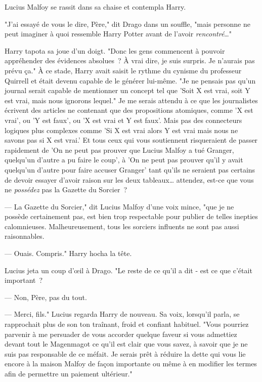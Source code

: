 Lucius Malfoy se rassit dans sa chaise et contempla Harry.

"J'ai essayé de vous le dire, Père," dit Drago dans un souffle, "mais personne ne peut imaginer à quoi ressemble Harry Potter avant de l'avoir \emph{rencontré}…"

Harry tapota sa joue d'un doigt. "Donc les gens commencent à pouvoir appréhender des évidences absolues~? À vrai dire, je suis surpris. Je n'aurais pas prévu ça." À ce stade, Harry avait saisit le rythme du cynisme du professeur Quirrell et était devenu capable de le générer lui-même. "Je ne pensais pas qu'un journal serait capable de mentionner un concept tel que 'Soit X est vrai, soit Y est vrai, mais nous ignorons lequel." Je me serais attendu à ce que les journalistes écrivent des articles ne contenant que des propositions atomiques, comme 'X est vrai', ou 'Y est faux', ou 'X est vrai et Y est faux'. Mais pas des connecteurs logiques plus complexes comme 'Si X est vrai alors Y est vrai mais nous ne savons pas si X est vrai.' Et tous ceux qui vous soutiennent risqueraient de passer rapidement de 'On ne peut pas prouver que Lucius Malfoy a tué Granger, quelqu'un d'autre a pu faire le coup', à 'On ne peut pas prouver qu'il y avait quelqu'un d'autre pour faire accuser Granger' tant qu'ils ne seraient pas certains de devoir essayer d'avoir raison sur les deux tableaux… attendez, est-ce que vous ne \emph{possédez} pas la Gazette du Sorcier~?

--- La Gazette du Sorcier," dit Lucius Malfoy d'une voix mince, "que je ne possède certainement pas, est bien trop respectable pour publier de telles inepties calomnieuses. Malheureusement, tous les sorciers influents ne sont pas aussi raisonnables.

--- Ouais. Compris." Harry hocha la tête.

Lucius jeta un coup d'œil à Drago. "Le reste de ce qu'il a dit - est ce que c'était important~?

--- Non, Père, pas du tout.

--- Merci, fils." Lucius regarda Harry de nouveau. Sa voix, lorsqu'il parla, se rapprochait plus de son ton traînant, froid et confiant habituel. "Vous pourriez parvenir à me persuader de vous accorder quelque faveur si vous admettiez devant tout le Magenmagot ce qu'il est clair que vous savez, à savoir que je ne suis pas responsable de ce méfait. Je serais prêt à réduire la dette qui vous lie encore à la maison Malfoy de façon importante ou même à en modifier les termes afin de permettre un paiement ultérieur."

